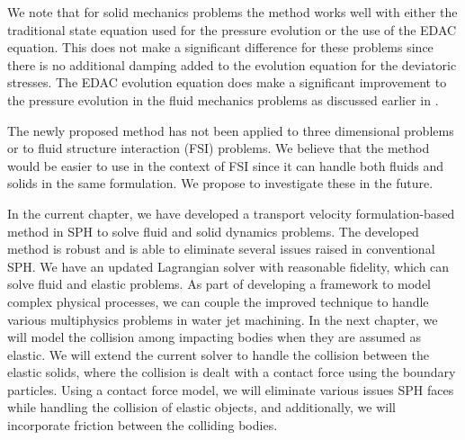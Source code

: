 We note that for solid mechanics problems the method works well with either
the traditional state equation used for the pressure evolution or the use of
the EDAC equation. This does not make a significant difference for these
problems since there is no additional damping added to the evolution equation
for the deviatoric stresses. The EDAC evolution equation does make a
significant improvement to the pressure evolution in the fluid mechanics
problems as discussed earlier in \citep{edac-sph:cf:2019}.

The newly proposed method has not been applied to three dimensional problems
or to fluid structure interaction (FSI) problems. We believe that the method
would be easier to use in the context of FSI since it can handle both fluids
and solids in the same formulation. We propose to investigate these in the
future.


In the current chapter, we have developed a transport velocity formulation-based
method in SPH to solve fluid and solid dynamics problems. The developed method
is robust and is able to eliminate several issues raised in conventional SPH. We
have an updated Lagrangian solver with reasonable fidelity, which can solve
fluid and elastic problems. As part of developing a framework to model complex
physical processes, we can couple the improved technique to handle various
multiphysics problems in water jet machining. In the next chapter, we will model
the collision among impacting bodies when they are assumed as elastic. We will
extend the current solver to handle the collision between the elastic solids,
where the collision is dealt with a contact force using the boundary particles.
Using a contact force model, we will eliminate various issues SPH faces while
handling the collision of elastic objects, and additionally, we will incorporate
friction between the colliding bodies.
